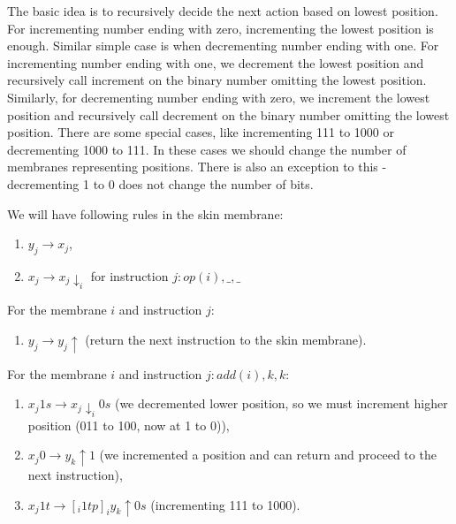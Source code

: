 \documentclass[submission,copyright,creativecommons]{../lib/lncs/llncs}
\begin{document}
The basic idea is to recursively decide the next action based on lowest position. For incrementing number ending with zero, incrementing the lowest position is enough. Similar simple case is when decrementing number ending with one. For incrementing number ending with one, we decrement the lowest position and recursively call increment on the binary number omitting the lowest position. Similarly, for decrementing number ending with zero, we increment the lowest position and recursively call decrement on the binary number omitting the lowest position.
There are some special cases, like incrementing 111 to 1000 or decrementing 1000 to 111. In these cases we should change the number of membranes representing positions. There is also an exception to this - decrementing 1 to 0 does not change the number of bits.

We will have following rules in the skin membrane:
\begin{enumerate}
  \item\label{optim_skin_next_instruction} $y_j \rightarrow x_j$,
  \item\label{optim_skin_send_down} $x_j \rightarrow x_j\downarrow_{i}$ for instruction $j: op(i), \_, \_$
\end{enumerate}

For the membrane $i$ and instruction $j$:
\begin{enumerate}[resume]
  \item\label{optim_inner_resend_up} $y_j \rightarrow y_j \uparrow$ (return the next instruction to the skin membrane).
\end{enumerate}

For the membrane $i$ and instruction $j: add(i),k,k$:
\begin{enumerate}[resume]
  \item\label{optim_inner_add_1} $x_j1s \rightarrow x_j\downarrow_{i}0s$ (we decremented lower position, so we must increment higher position (011 to 100, now at 1 to 0)),
  \item\label{optim_inner_add_0} $x_j0 \rightarrow y_k \uparrow 1$ (we incremented a position and can return and proceed to the next instruction),
  \item\label{optim_inner_add_1_highest} $x_j1t \rightarrow [_i 1tp]_iy_k\uparrow 0s$ (incrementing 111 to 1000).
\end{enumerate}
\end{document}
